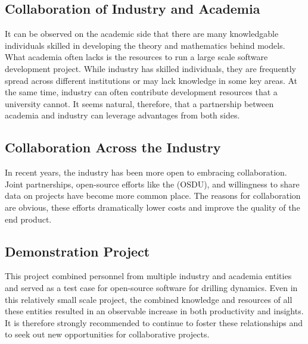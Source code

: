 \subsection{Collaboration of Industry and Academia}
It can be observed on the academic side that there are many knowledgable individuals skilled in developing the theory and mathematics behind models.  What academia often lacks is the resources to run a large scale software development project.  While industry has skilled individuals, they are frequently spread across different institutions or may lack knowledge in some key areas.  At the same time, industry can often contribute development resources that a university cannot.  It seems natural, therefore, that a partnership between academia and industry can leverage advantages from both sides.

\subsection{Collaboration Across the Industry}
In recent years, the industry has been more open to embracing collaboration.  Joint partnerships, open-source efforts like the \osdu{} (OSDU), and willingness to share data on projects have become more common place.  The reasons for collaboration are obvious, these efforts dramatically lower costs and improve the quality of the end product.

\subsection{Demonstration Project}
This project combined personnel from multiple industry and academia entities and served as a test case for open-source software for drilling dynamics.  Even in this relatively small scale project, the combined knowledge and resources of all these entities resulted in an observable increase in both productivity and insights.  It is therefore strongly recommended to continue to foster these relationships and to seek out new opportunities for collaborative projects.


